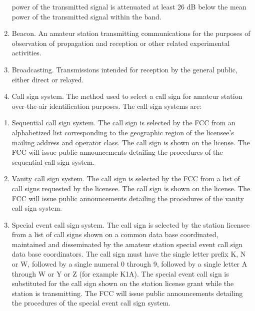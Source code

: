 \documentclass[
  letterpaper,
  DIV=11,
  numbers=noendperiod]{scrreport}
\begin{document}
\begin{enumerate}
  power of the transmitted signal is attenuated at least 26 dB below the
  mean power of the transmitted signal within the band.
\item
  \leavevmode{}%
  Beacon. An amateur station transmitting communications for the
  purposes of observation of propagation and reception or other related
  experimental activities.
\item
  \leavevmode{}%
  Broadcasting. Transmissions intended for reception by the general
  public, either direct or relayed.
\item
  Call sign system. The method used to select a call sign for amateur
  station over-the-air identification purposes. The call sign systems
  are:
\end{enumerate}

\begin{enumerate}
\def\labelenumi{(\roman{enumi})}
\item
  Sequential call sign system. The call sign is selected by the FCC from
  an alphabetized list corresponding to the geographic region of the
  licensee's mailing address and operator class. The call sign is shown
  on the license. The FCC will issue public announcements detailing the
  procedures of the sequential call sign system.
\item
  Vanity call sign system. The call sign is selected by the FCC from a
  list of call signs requested by the licensee. The call sign is shown
  on the license. The FCC will issue public announcements detailing the
  procedures of the vanity call sign system.
\item
  Special event call sign system. The call sign is selected by the
  station licensee from a list of call signs shown on a common data base
  coordinated, maintained and disseminated by the amateur station
  special event call sign data base coordinators. The call sign must
  have the single letter prefix K, N or W, followed by a single numeral
  0 through 9, followed by a single letter A through W or Y or Z (for
  example K1A). The special event call sign is substituted for the call
  sign shown on the station license grant while the station is
  transmitting. The FCC will issue public announcements detailing the
  procedures of the special event call sign system.
\end{enumerate}
\end{document}
